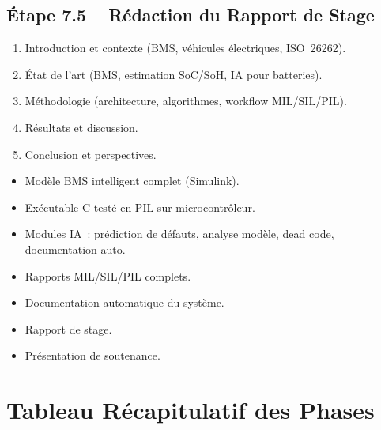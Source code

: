 \documentclass[a4paper,12pt]{article}
\begin{document}
\subsection{Étape 7.5 -- Rédaction du Rapport de Stage}
\begin{enumerate}[nosep]
  \item Introduction et contexte (BMS, véhicules électriques, ISO~26262).
  \item État de l'art (BMS, estimation SoC/SoH, IA pour batteries).
  \item Méthodologie (architecture, algorithmes, workflow MIL/SIL/PIL).
  \item Résultats et discussion.
  \item Conclusion et perspectives.
\end{enumerate}

\begin{deliverablebox}
\begin{itemize}[nosep]
  \item Modèle BMS intelligent complet (Simulink).
  \item Exécutable C testé en PIL sur microcontrôleur.
  \item Modules IA~: prédiction de défauts, analyse modèle, dead code, documentation auto.
  \item Rapports MIL/SIL/PIL complets.
  \item Documentation automatique du système.
  \item Rapport de stage.
  \item Présentation de soutenance.
\end{itemize}
\end{deliverablebox}

\newpage
\section{Tableau Récapitulatif des Phases}
\end{document}
